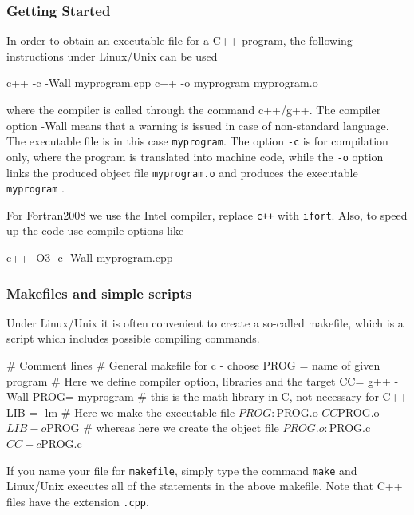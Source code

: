 \documentclass[handout]{beamer}
\newenvironment{block_mdfboxadmon}[1][]{\begin{block}{#1}}{\end{block}}
\begin{document}
\begin{frame}
\frametitle{Getting Started}

\begin{block_mdfboxadmon}
In order to obtain an executable file for a C++ program, the following
instructions under Linux/Unix can be used

\begin{print}
c++ -c -Wall myprogram.cpp
c++ -o myprogram myprogram.o
\end{print}
where the compiler is called through the command c++/g++. The compiler
option -Wall means that a warning is issued in case of non-standard
language. The executable file is in this case \Verb!myprogram!. The option
\Verb!-c! is for compilation only, where the program is translated into machine code,
while the \Verb!-o! option links the produced object file \Verb!myprogram.o!
and produces the executable \Verb!myprogram! .

For Fortran2008 we use the Intel compiler, replace \Verb!c++! with \Verb!ifort!.
Also, to speed up the code use compile options like

\begin{print}
c++ -O3 -c -Wall myprogram.cpp
\end{print}
\end{block_mdfboxadmon}
\end{frame}

\begin{frame}
\frametitle{Makefiles and simple scripts}

Under Linux/Unix it is often convenient to create a
so-called makefile, which is a script which includes possible
compiling commands.

\begin{print}
# Comment lines
# General makefile for c - choose PROG =   name of given program
# Here we define compiler option, libraries and the  target
CC= g++ -Wall
PROG= myprogram
# this is the math library in C, not necessary for C++
LIB = -lm
# Here we make the executable file
${PROG} :          ${PROG}.o
                   ${CC} ${PROG}.o ${LIB} -o ${PROG}
# whereas here we create the object file
${PROG}.o :       ${PROG}.c
                  ${CC} -c ${PROG}.c
\end{print}
If you name your file for \Verb!makefile!, simply type the command
\Verb!make! and Linux/Unix executes all of the statements in the above
makefile. Note that C++ files have the extension \Verb!.cpp!.
\end{frame}
\end{document}
